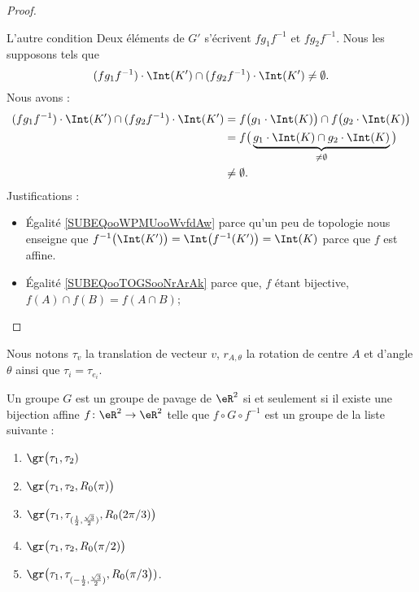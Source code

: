 \begin{proof}
\begin{subproof}
		\item[L'autre condition]
		Deux éléments de \( G'\) s'écrivent \( fg_1f^{-1}\) et \( fg_2f^{-1}\). Nous les supposons tels que
		\begin{equation}
			(fg_1f^{-1})\cdot \Int(K')\cap(f g_2 f^{-1})\cdot\Int(K')\neq \emptyset.
		\end{equation}
		Nous avons :
		\begin{subequations}
			\begin{align}
				(fg_1f^{-1})\cdot \Int(K')\cap(f g_2 f^{-1})\cdot\Int(K') & =f\big( g_1\cdot\Int(K) \big)\cap f\big( g_2\cdot\Int(K) \big) \label{SUBEQooWPMUooWvfdAw}                           \\
				                                                          & =f\big(  \underbrace{g_1\cdot\Int(K)\cap g_2\cdot\Int(K)}_{\neq \emptyset}  \big)        \label{SUBEQooTOGSooNrArAk} \\
				                                                          & \neq \emptyset.
			\end{align}
		\end{subequations}
		Justifications :
		\begin{itemize}
			\item Égalité \eqref{SUBEQooWPMUooWvfdAw} parce qu'un peu de topologie nous enseigne que \( f^{-1}\big( \Int(K') \big)=  \Int\big( f^{-1}(K') \big)=\Int(K)  \) parce que \( f\) est affine.
			\item Égalité \eqref{SUBEQooTOGSooNrArAk} parce que, \( f\) étant bijective, \( f(A)\cap f(B)=f(A\cap B)\);
		\end{itemize}
	\end{subproof}
\end{proof}

\begin{theorem}       \label{THOooUPHQooYfeHAy}
	Nous notons \( \tau_v\) la translation de vecteur \( v\), \( r_{A,\theta}\) la rotation de centre \( A\) et d'angle \( \theta\) ainsi que \( \tau_i=\tau_{e_i}\).

	Un groupe \( G\) est un groupe de pavage de \( \eR^2\) si et seulement si il existe une bijection affine \( f\colon \eR^2\to \eR^2\) telle que \( f\circ G\circ f^{-1}\) est un groupe de la liste suivante :
	\begin{enumerate}
		\item
		      \( \gr\big(\tau_1,\tau_2)\)
		\item
		      \( \gr\big(\tau_1,\tau_2,R_0(\pi)\big)\)
		\item
		      \( \gr\big(\tau_1,\tau_{(\frac{ 1 }{2},\frac{ \sqrt{ 3 } }{ 2 })},R_0(2\pi/3)\big)\)
		\item
		      \( \gr\big(\tau_1,\tau_2,R_0(\pi/2)\big)\)
		\item
		      \( \gr\big(\tau_1,\tau_{(-\frac{ 1 }{2},\frac{ \sqrt{ 3 } }{2})},R_0(\pi/3\big))\).
	\end{enumerate}
\end{theorem}

